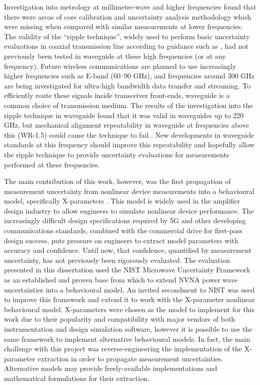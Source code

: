 \documentclass[../thesis/thesis.tex]{subfiles}
\begin{document}
\begin{refsection}
Investigation into metrology at millimetre-wave and higher frequencies found that there were areas of core calibration and uncertainty analysis methodology which were missing when compared with similar measurements at lower frequencies. The validity of the ``ripple technique'', widely used to perform basic uncertainty evaluations in coaxial transmission line according to guidance such as \cite{EURAMET_2011}, had not previously been tested in waveguide at these high frequencies (or at any frequency). Future wireless communications are planned to use increasingly higher frequencies such as E-band (60--90 GHz), and frequencies around 300 GHz are being investigated for ultra-high bandwidth data transfer and streaming. To efficiently route these signals inside transceiver front-ends, waveguide is a common choice of transmission medium. The results of the investigation into the ripple technique in waveguide found that it was valid in waveguides up to 220 GHz, but mechanical alignment repeatability in waveguide at frequencies above this (WR-1.5) could cause the technique to fail \cite{Stant_2016_Coll,Stant_2017}. New developments in waveguide standards at this frequency should improve this repeatability and hopefully allow the ripple technique to provide uncertainty evaluations for measurements performed at these frequencies.

The main contribution of this work, however, was the first propagation of measurement uncertainty from nonlinear device measurements into a behavioural model, specifically X-parameters \cite{Stant_2018_TMTT}. This model is widely used in the amplifier design industry to allow engineers to simulate nonlinear device performance. The increasingly difficult design specifications required by 5G and other developing communications standards, combined with the commercial drive for first-pass design success, puts pressure on engineers to extract model parameters with accuracy and confidence. Until now, that confidence, quantified by measurement uncertainty, has not previously been rigorously evaluated. The evaluation presented in this dissertation used the NIST Microwave Uncertainty Framework as an established and proven base from which to extend NVNA power wave uncertainties into a behavioural model. An invited secondment to NIST was used to improve this framework and extend it to work with the X-parameter nonlinear behavioural model. X-parameters were chosen as the model to implement for this work due to their popularity and compatibility with major vendors of both instrumentation and design simulation software, however it is possible to use the same framework to implement alternative behavioural models. In fact, the main challenge with this project was reverse-engineering the implementation of the X-parameter extraction in order to propagate measurement uncertainties. Alternative models may provide freely-available implementations and mathematical formulations for their extraction.


\end{refsection}
\end{document}
